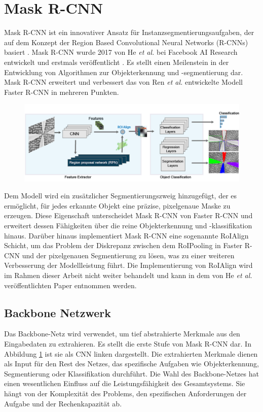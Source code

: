 \section{Mask R-CNN}
Mask R-CNN ist ein innovativer Ansatz für Instanzsegmentierungsaufgaben, der auf dem Konzept der Region Based Convolutional Neural Networks (R-CNNs) basiert \cite{Girshick_2015_ICCV}\cite{7112511}. Mask R-CNN wurde 2017 von He \textit{et al.} bei Facebook AI Research entwickelt und erstmals veröffentlicht \cite{He_2017_ICCV}. Es stellt einen Meilenstein in der Entwicklung von Algorithmen zur Objekterkennung und -segmentierung dar.
Mask R-CNN erweitert und verbessert das von Ren \textit{et al.} entwickelte Modell Faster R-CNN \cite{DBLP:journals/corr/RenHG015} in mehreren Punkten.
\begin{figure}[htbp]
    \centering
    \includegraphics[width=\linewidth]{img/maskrcnn_network_custom.png}
    \label{fig:maskrcnn}
\end{figure}
Dem Modell wird ein zusätzlicher Segmentierungszweig hinzugefügt, der es ermöglicht, für jedes erkannte Objekt eine präzise, pixelgenaue Maske zu erzeugen. Diese Eigenschaft unterscheidet Mask R-CNN von Faster R-CNN und erweitert dessen Fähigkeiten über die reine Objekterkennung und -klassifikation hinaus. Darüber hinaus implementiert Mask R-CNN eine sogenannte RoIAlign Schicht, um das Problem der Diskrepanz zwischen dem RoIPooling in Faster R-CNN und der pixelgenauen Segmentierung zu lösen, was zu einer weiteren Verbesserung der Modellleistung führt. Die Implementierung von RoIAlign wird im Rahmen dieser Arbeit nicht weiter behandelt und kann in dem von He \textit{et al.} veröffentlichten Paper \cite{He_2017_ICCV} entnommen werden.
\subsection{Backbone Netzwerk}
\label{sec:backbone}
Das Backbone-Netz wird verwendet, um tief abstrahierte Merkmale aus den Eingabedaten zu extrahieren. Es stellt die erste Stufe von Mask R-CNN dar. In Abbildung \ref{fig:maskrcnn} ist sie als \glqq CNN\grqq{} linken dargestellt.
Die extrahierten Merkmale dienen als Input für den Rest des Netzes, das spezifische Aufgaben wie Objekterkennung, Segmentierung oder Klassifikation durchführt.
Die Wahl des Backbone-Netzes hat einen wesentlichen Einfluss auf die Leistungsfähigkeit des Gesamtsystems. Sie hängt von der Komplexität des Problems, den spezifischen Anforderungen der Aufgabe und der Rechenkapazität ab.

